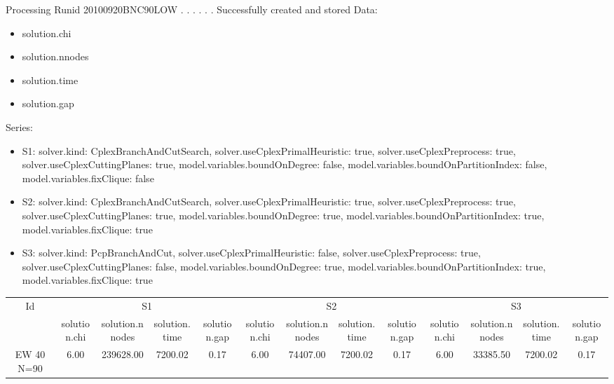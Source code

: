\documentclass[landscape, 12pt]{report}
\begin{document}
 
Processing Runid 20100920BNC90LOW
. . . . . .  Successfully created and stored
Data:
\begin{itemize}
\item solution.chi
\item solution.nnodes
\item solution.time
\item solution.gap
\end{itemize}
Series:
\begin{itemize}
\item S1: solver.kind: CplexBranchAndCutSearch, solver.useCplexPrimalHeuristic: true, solver.useCplexPreprocess: true, solver.useCplexCuttingPlanes: true, model.variables.boundOnDegree: false, model.variables.boundOnPartitionIndex: false, model.variables.fixClique: false
\item S2: solver.kind: CplexBranchAndCutSearch, solver.useCplexPrimalHeuristic: true, solver.useCplexPreprocess: true, solver.useCplexCuttingPlanes: true, model.variables.boundOnDegree: true, model.variables.boundOnPartitionIndex: true, model.variables.fixClique: true
\item S3: solver.kind: PcpBranchAndCut, solver.useCplexPrimalHeuristic: false, solver.useCplexPreprocess: true, solver.useCplexCuttingPlanes: false, model.variables.boundOnDegree: true, model.variables.boundOnPartitionIndex: true, model.variables.fixClique: true
\end{itemize}
\begin{tabular}{|c|cccc|cccc|cccc|}
\hline
\multicolumn{1}{|c|}{Id} & \multicolumn{4}{|c|}{S1} & \multicolumn{4}{|c|}{S2} & \multicolumn{4}{|c|}{S3}
\\
 & solution.chi & solution.nnodes & solution.time & solution.gap & solution.chi & solution.nnodes & solution.time & solution.gap & solution.chi & solution.nnodes & solution.time & solution.gap
\\
\hline
EW 40 N=90 & 6.00 & 239628.00 & 7200.02 & 0.17 & 6.00 & 74407.00 & 7200.02 & 0.17 & 6.00 & 33385.50 & 7200.02 & 0.17
\\
\hline 
 \end{tabular}
 
\end{document}
